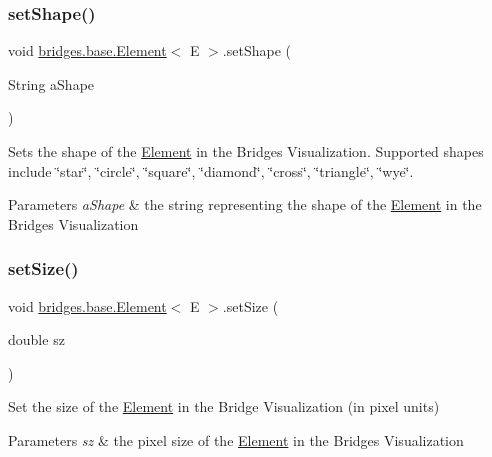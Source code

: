 \subsubsection{\texorpdfstring{setShape()}{setShape()}}
{\footnotesize\ttfamily void \mbox{\hyperlink{classbridges_1_1base_1_1_element}{bridges.\+base.\+Element}}$<$ E $>$.set\+Shape (\begin{DoxyParamCaption}\item[{String}]{a\+Shape }\end{DoxyParamCaption})}

Sets the shape of the \mbox{\hyperlink{classbridges_1_1base_1_1_element}{Element}} in the Bridges Visualization. Supported shapes include \char`\"{}star\char`\"{}, \char`\"{}circle\char`\"{}, \char`\"{}square\char`\"{}, \char`\"{}diamond\char`\"{}, \char`\"{}cross\char`\"{}, \char`\"{}triangle\char`\"{}, \char`\"{}wye\char`\"{}.


\begin{DoxyParams}{Parameters}
{\em a\+Shape} & the string representing the shape of the \mbox{\hyperlink{classbridges_1_1base_1_1_element}{Element}} in the Bridges Visualization \\
\hline
\end{DoxyParams}
\mbox{\label{classbridges_1_1base_1_1_element_a57153c203d8d2790650edb14ad61c338}} 
\subsubsection{\texorpdfstring{setSize()}{setSize()}}
{\footnotesize\ttfamily void \mbox{\hyperlink{classbridges_1_1base_1_1_element}{bridges.\+base.\+Element}}$<$ E $>$.set\+Size (\begin{DoxyParamCaption}\item[{double}]{sz }\end{DoxyParamCaption})}

Set the size of the \mbox{\hyperlink{classbridges_1_1base_1_1_element}{Element}} in the Bridge Visualization (in pixel units)


\begin{DoxyParams}{Parameters}
{\em sz} & the pixel size of the \mbox{\hyperlink{classbridges_1_1base_1_1_element}{Element}} in the Bridges Visualization \\
\hline
\end{DoxyParams}
\mbox{\label{classbridges_1_1base_1_1_element_ab3cf1241da0bc4c59cea9d6f0fd7aaf4}} 
